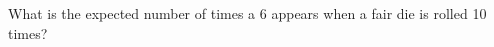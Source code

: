 \documentclass[../main.tex]{subfiles}
\begin{document}
What is the expected number of times a 6 appears when a fair die is rolled 10 times?

\solution
\end{document}
